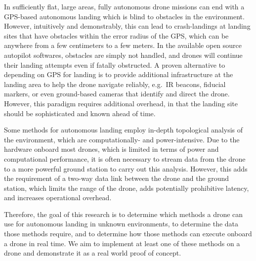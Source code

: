 In sufficiently flat, large areas, fully autonomous drone missions can end with a GPS-based
autonomous landing which is blind to obstacles in the environment.
However,
intuitively and demonstrably,
this can lead to crash-landings at landing sites that have obstacles within
the error radius of the GPS,
which can be anywhere from a few centimeters to a few meters.
In the available open source autopilot softwares,
obstacles are simply not handled,
and drones will continue their landing attempts even if fatally obstructed.
A proven alternative to depending on GPS for landing is to provide additional infrastructure at the landing area
to help the drone navigate reliably, e.g.~IR beacons, fiducial markers, or even ground-based cameras that identify and direct the drone.
However, this paradigm requires additional overhead, in that the landing site should be sophisticated and known ahead of time.

Some methods for autonomous landing employ in-depth topological analysis of the environment,
which are computationally- and power-intensive.
Due to the hardware onboard most drones, which is limited in terms of power and computational performance,
it is often necessary to stream data from the drone to a more powerful ground station to carry out this analysis.
However, this adds the requirement of a two-way data link between the drone and the ground station,
which limits the range of the drone, adds potentially prohibitive latency, and increases operational overhead.

Therefore, the goal of this research is to determine which methods a drone can use for autonomous landing in unknown environments,
to determine the data those methods require, and to determine how those methods can execute onboard a drone in real time.
We aim to implement at least one of these methods on a drone and demonstrate it as a real world proof of concept.